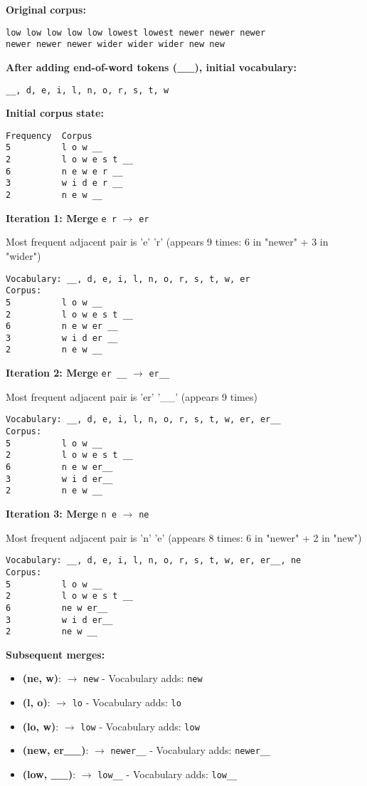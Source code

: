 \documentclass[11pt,a4paper]{article}
\theoremstyle{definition}
\theoremstyle{plain}
\theoremstyle{remark}
\begin{document}
\textbf{Original corpus:}
\begin{verbatim}
low low low low low lowest lowest newer newer newer 
newer newer newer wider wider wider new new
\end{verbatim}

\textbf{After adding end-of-word tokens (\_\_), initial vocabulary:}
\begin{center}
\texttt{\_\_, d, e, i, l, n, o, r, s, t, w}
\end{center}

\textbf{Initial corpus state:}
\begin{verbatim}
Frequency  Corpus
5          l o w __
2          l o w e s t __
6          n e w e r __
3          w i d e r __
2          n e w __
\end{verbatim}

\textbf{Iteration 1: Merge} \texttt{e r} $\rightarrow$ \texttt{er}

Most frequent adjacent pair is 'e' 'r' (appears 9 times: 6 in "newer" + 3 in "wider")

\begin{verbatim}
Vocabulary: __, d, e, i, l, n, o, r, s, t, w, er
Corpus:
5          l o w __
2          l o w e s t __
6          n e w er __
3          w i d er __
2          n e w __
\end{verbatim}

\textbf{Iteration 2: Merge} \texttt{er \_\_} $\rightarrow$ \texttt{er\_\_}

Most frequent adjacent pair is 'er' '\_\_' (appears 9 times)

\begin{verbatim}
Vocabulary: __, d, e, i, l, n, o, r, s, t, w, er, er__
Corpus:
5          l o w __
2          l o w e s t __
6          n e w er__
3          w i d er__
2          n e w __
\end{verbatim}

\textbf{Iteration 3: Merge} \texttt{n e} $\rightarrow$ \texttt{ne}

Most frequent adjacent pair is 'n' 'e' (appears 8 times: 6 in "newer" + 2 in "new")

\begin{verbatim}
Vocabulary: __, d, e, i, l, n, o, r, s, t, w, er, er__, ne
Corpus:
5          l o w __
2          l o w e s t __
6          ne w er__
3          w i d er__
2          ne w __
\end{verbatim}

\textbf{Subsequent merges:}
\begin{itemize}
    \item \textbf{(ne, w)}: $\rightarrow$ \texttt{new} - Vocabulary adds: \texttt{new}
    \item \textbf{(l, o)}: $\rightarrow$ \texttt{lo} - Vocabulary adds: \texttt{lo}
    \item \textbf{(lo, w)}: $\rightarrow$ \texttt{low} - Vocabulary adds: \texttt{low}
    \item \textbf{(new, er\_\_)}: $\rightarrow$ \texttt{newer\_\_} - Vocabulary adds: \texttt{newer\_\_}
    \item \textbf{(low, \_\_)}: $\rightarrow$ \texttt{low\_\_} - Vocabulary adds: \texttt{low\_\_}
\end{itemize}
\end{document}
